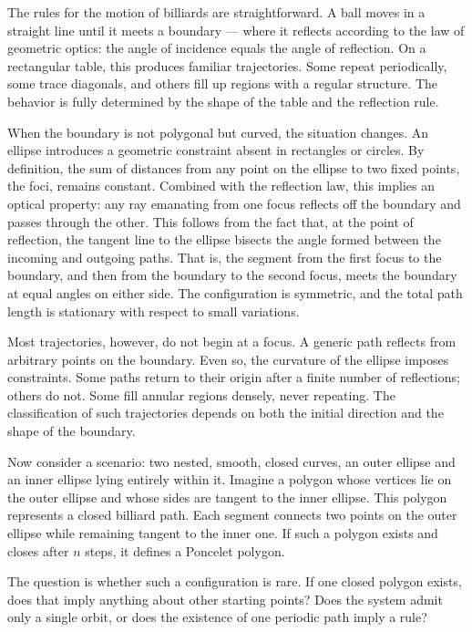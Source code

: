 The rules for the motion of billiards are straightforward. A ball moves in a straight line until it meets a boundary — where it reflects according to the law of geometric optics: the angle of incidence equals the angle of reflection. On a rectangular table, this produces familiar trajectories. Some repeat periodically, some trace diagonals, and others fill up regions with a regular structure. The behavior is fully determined by the shape of the table and the reflection rule.

When the boundary is not polygonal but curved, the situation changes. An ellipse introduces a geometric constraint absent in rectangles or circles. By definition, the sum of distances from any point on the ellipse to two fixed points, the foci, remains constant. Combined with the reflection law, this implies an optical property: any ray emanating from one focus reflects off the boundary and passes through the other. This follows from the fact that, at the point of reflection, the tangent line to the ellipse bisects the angle formed between the incoming and outgoing paths. That is, the segment from the first focus to the boundary, and then from the boundary to the second focus, meets the boundary at equal angles on either side. The configuration is symmetric, and the total path length is stationary with respect to small variations.

Most trajectories, however, do not begin at a focus. A generic path reflects from arbitrary points on the boundary. Even so, the curvature of the ellipse imposes constraints. Some paths return to their origin after a finite number of reflections; others do not. Some fill annular regions densely, never repeating. The classification of such trajectories depends on both the initial direction and the shape of the boundary.

Now consider a scenario: two nested, smooth, closed curves, an outer ellipse and an inner ellipse lying entirely within it. Imagine a polygon whose vertices lie on the outer ellipse and whose sides are tangent to the inner ellipse. This polygon represents a closed billiard path. Each segment connects two points on the outer ellipse while remaining tangent to the inner one. If such a polygon exists and closes after $n$ steps, it defines a Poncelet polygon.

The question is whether such a configuration is rare. If one closed polygon exists, does that imply anything about other starting points? Does the system admit only a single orbit, or does the existence of one periodic path imply a rule?

